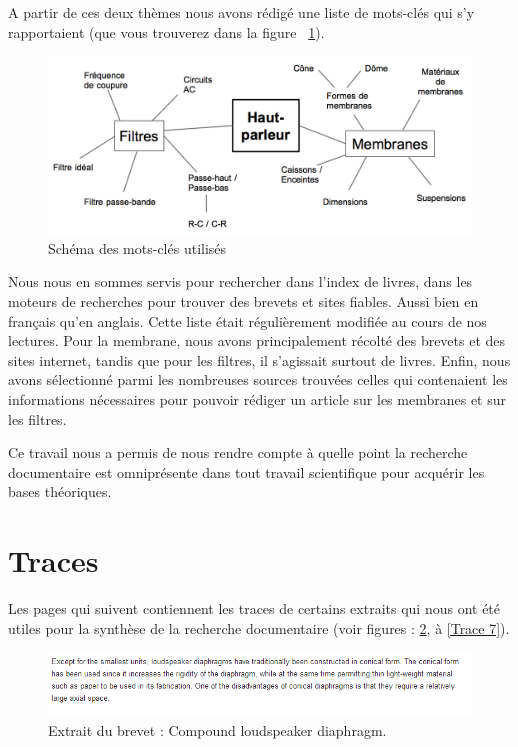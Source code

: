 A partir de ces deux thèmes nous avons rédigé une liste de mots-clés qui s'y rapportaient (que vous trouverez dans la figure ~\ref{Schema mots-clefs}).

\begin{figure}
\begin{center}
\includegraphics[scale=0.35]{img/Mots-clefs.png}
\end{center}
\caption{Schéma des mots-clés utilisés}
 \label{Schema mots-clefs}
\end{figure}

Nous nous en sommes servis pour rechercher dans l'index de livres, dans les moteurs de recherches pour trouver des brevets et sites fiables. Aussi bien en français qu'en anglais. Cette liste était régulièrement modifiée au cours de nos lectures. Pour la membrane, nous avons principalement récolté des brevets et des sites internet, tandis que pour les filtres, il s'agissait surtout de livres. 
Enfin, nous avons sélectionné parmi les nombreuses sources trouvées celles qui contenaient les informations nécessaires pour pouvoir rédiger un article sur les membranes et sur les filtres.
\newline

Ce travail nous a permis de nous rendre compte à quelle point la recherche documentaire est omniprésente dans tout travail scientifique pour acquérir les bases théoriques.
\newline

\section{Traces}

Les pages qui suivent contiennent les traces de certains extraits qui nous ont été utiles pour la synthèse de la recherche documentaire (voir figures : \ref{Trace 1}, à \ref{Trace 7}).

\begin{figure}[h]
\begin{center}
\includegraphics[scale=0.8]{img/Trace1-brevet-US-3153463.png}
\end{center}
\caption{Extrait du brevet \cite{f1964compound} : Compound loudspeaker diaphragm.} %
\label{Trace 1}
\end{figure}


